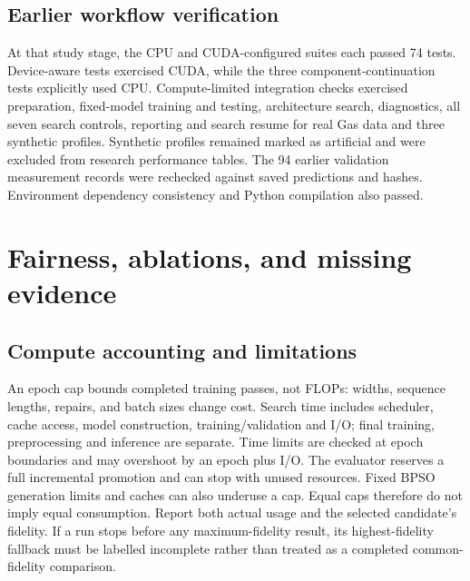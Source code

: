 \documentclass[11pt,a4paper]{report}
\begin{document}



\section{Earlier workflow verification}
At that study stage, the CPU and CUDA-configured suites each passed 74 tests. Device-aware tests exercised CUDA, while the three component-continuation tests explicitly used CPU. Compute-limited integration checks exercised preparation, fixed-model training and testing, architecture search, diagnostics, all seven search controls, reporting and search resume for real Gas data and three synthetic profiles. Synthetic profiles remained marked as artificial and were excluded from research performance tables. The 94 earlier validation measurement records were rechecked against saved predictions and hashes. Environment dependency consistency and Python compilation also passed.



\chapter{Fairness, ablations, and missing evidence}
\section{Compute accounting and limitations}
An epoch cap bounds completed training passes, not FLOPs: widths, sequence lengths, repairs, and batch sizes change cost. Search time includes scheduler, cache access, model construction, training/validation and I/O; final training, preprocessing and inference are separate. Time limits are checked at epoch boundaries and may overshoot by an epoch plus I/O. The evaluator reserves a full incremental promotion and can stop with unused resources. Fixed BPSO generation limits and caches can also underuse a cap. Equal caps therefore do not imply equal consumption. Report both actual usage and the selected candidate's fidelity. If a run stops before any maximum-fidelity result, its highest-fidelity fallback must be labelled incomplete rather than treated as a completed common-fidelity comparison.
\end{document}
